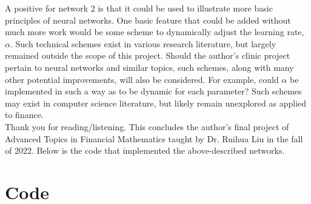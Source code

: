 \documentclass[reqno,14pt]{amsart}
\theoremstyle{plain}
\theoremstyle{definition}
\theoremstyle{remark}
\begin{document}
A positive for network 2 is that it could be used to illustrate more basic principles of neural networks. One basic feature that could be added without much more work would be some scheme to dynamically adjust the learning rate, $\alpha$. Such technical schemes exist in various research literature, but largely remained outside the scope of this project. Should the author's clinic project pertain to neural networks and similar topics, such schemes, along with many other potential improvements, will also be considered. For example, could $\alpha$ be implemented in such a way as to be dynamic for each parameter? Such schemes may exist in computer science literature, but likely remain unexplored as applied to finance.\\

Thank you for reading/listening. This concludes the author's final project of Advanced Topics in Financial Mathematics taught by Dr. Ruihua Liu in the fall of 2022. Below is the code that implemented the above-described networks.\\

\section{Code}
\end{document}
